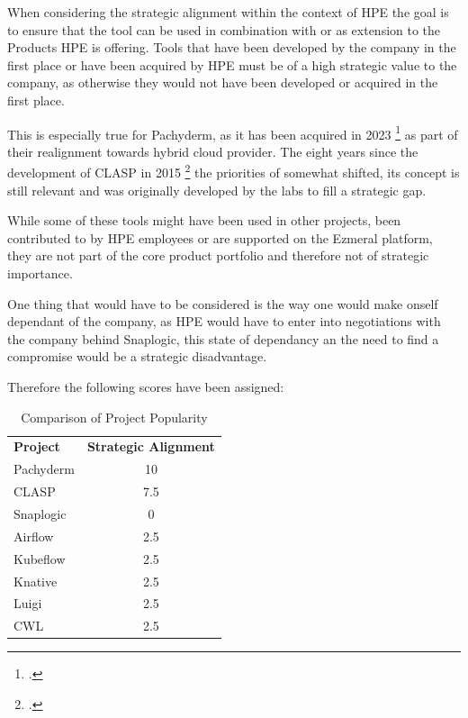 
When considering the strategic alignment within the context of \ac{HPE} the goal is to ensure that the tool can be used in combination with or as extension to the Products \ac{HPE} is offering.
Tools that have been developed by the company in the first place or have been acquired by \ac{HPE} must be of a high strategic value to the company, as otherwise they would not have been developed or acquired in the first place.

This is especially true for Pachyderm, as it has been acquired in 2023 \footcite{HewlettPackardEnterprise} as part of their realignment towards hybrid cloud provider.
The eight years since the development of \ac{CLASP} in 2015 \footcite{sayersCLoudApplicationServices2015} the priorities of somewhat shifted, its concept is still relevant and was originally developed by the labs to fill a strategic gap.

While some of these tools might have been used in other projects, been contributed to by \ac{HPE} employees or are supported on the Ezmeral platform, they are not part 
of the core product portfolio and therefore not of strategic importance.

One thing that would have to be considered is the way one would make onself dependant of the company, as \ac{HPE} would have to enter into negotiations with the company behind Snaplogic, 
this state of dependancy an the need to find a compromise would be a strategic disadvantage.

Therefore the following scores have been assigned:

\begin{table}[htb]
  \centering
  \caption{Comparison of Project Popularity}
  \label{tab:table1} 
  \begin{tabular}{|l|c|} 
    \textbf{Project} & \textbf{Strategic Alignment} \\
    Pachyderm  & 10   \\
    \ac{CLASP}       & 7.5  \\
    Snaplogic      & 0          \\
    Airflow      & 2.5          \\
    Kubeflow      & 2.5          \\
    Knative      & 2.5          \\
    Luigi      & 2.5          \\
    CWL      & 2.5          \\
  \end{tabular}
\end{table}


